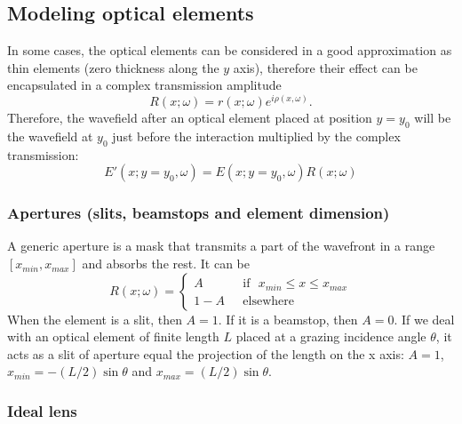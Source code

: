 \documentclass[preprint]{iucr}              %
\begin{document}
\subsection{Modeling optical elements}
\label{sec:elements}

In some cases, the optical elements can be considered in a good approximation as thin elements (zero thickness along the $y$ axis), therefore their effect can be encapsulated in a complex transmission amplitude 
\begin{equation}
    \label{eq:thinelement}
    R(x;\omega)=r(x;\omega) e^{i \rho(x,\omega)}.
\end{equation}
Therefore, the wavefield after an optical element placed at position $y=y_0$ will be the wavefield at $y_0$ just before the interaction multiplied by the complex transmission:
\begin{equation}
    E'(x;y=y_0,\omega) = E(x;y=y_0,\omega) R(x;\omega)
\end{equation}


\subsubsection{Apertures (slits, beamstops and element dimension)}
\label{sec:aperture}

A generic aperture is a mask that transmits a part of the wavefront in a range $[x_{min},x_{max}]$ and absorbs the rest. It can be
\begin{equation}
R(x;\omega) =
\left\{
\begin{matrix}
A  & \mbox{~~if~~} x_{min} \le x \le x_{max}
\\ 
1 - A & \mbox{~~elsewhere}
\end{matrix}
\right.
\end{equation}
When the element is a slit, then $A=1$. If it is a beamstop, then $A=0$. If we deal with an optical element of finite length $L$ placed at a grazing incidence angle $\theta$, it acts as a slit of aperture equal the projection of the length on the x axis: $A=1$, $x_{min}=-(L/2) \sin \theta$ and $x_{max}=(L/2) \sin \theta$. 

\subsubsection{Ideal lens}
\label{sec:idealLens}
\end{document}

